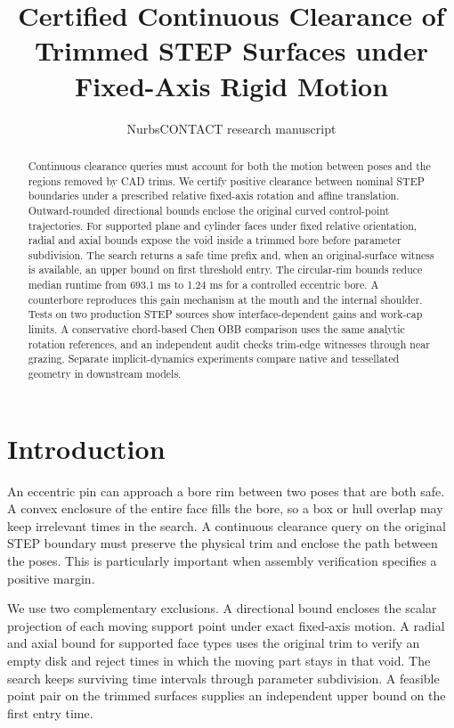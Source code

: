 \documentclass[10pt,a4paper]{article}
\title{\textbf{Certified Continuous Clearance of Trimmed STEP Surfaces under Fixed-Axis Rigid Motion}}
\author{NurbsCONTACT research manuscript}
\date{}
\begin{document}
\maketitle

\begin{abstract}
Continuous clearance queries must account for both the motion between poses and the regions removed by CAD trims. We certify positive clearance between nominal STEP boundaries under a prescribed relative fixed-axis rotation and affine translation. Outward-rounded directional bounds enclose the original curved control-point trajectories. For supported plane and cylinder faces under fixed relative orientation, radial and axial bounds expose the void inside a trimmed bore before parameter subdivision. The search returns a safe time prefix and, when an original-surface witness is available, an upper bound on first threshold entry. The circular-rim bounds reduce median runtime from 693.1 ms to 1.24 ms for a controlled eccentric bore. A counterbore reproduces this gain mechanism at the mouth and the internal shoulder. Tests on two production STEP sources show interface-dependent gains and work-cap limits. A conservative chord-based Chen OBB comparison uses the same analytic rotation references, and an independent audit checks trim-edge witnesses through near grazing. Separate implicit-dynamics experiments compare native and tessellated geometry in downstream models.
\end{abstract}

\section{Introduction}

An eccentric pin can approach a bore rim between two poses that are both safe. A convex enclosure of the entire face fills the bore, so a box or hull overlap may keep irrelevant times in the search. A continuous clearance query on the original STEP boundary must preserve the physical trim and enclose the path between the poses. This is particularly important when assembly verification specifies a positive margin.

We use two complementary exclusions. A directional bound encloses the scalar projection of each moving support point under exact fixed-axis motion. A radial and axial bound for supported face types uses the original trim to verify an empty disk and reject times in which the moving part stays in that void. The search keeps surviving time intervals through parameter subdivision. A feasible point pair on the trimmed surfaces supplies an independent upper bound on the first entry time.
\end{document}
